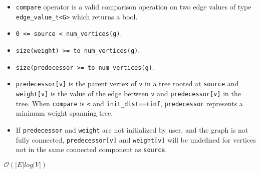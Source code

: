 {\small
      
}

\begin{itemdescr}
      \pnum\mandates
            \begin{itemize}
                  \item
                        \lstinline{compare} operator is a valid comparison operation on two edge values of type \lstinline{edge_value_t<G>} which returns a bool.
            \end{itemize}
      \pnum\hardprecond
            \begin{itemize}
                  \item
                        \lstinline{0 <= source < num_vertices(g)}.
                  \item
                        \lstinline{size(weight) >= to num_vertices(g)}.
                  \item
                        \lstinline{size(predecessor >= to num_vertices(g)}.
            \end{itemize}
      \pnum\effects
            \begin{itemize}
                  \item
                        \lstinline{predecessor[v]} is the parent vertex of \lstinline{v} in a tree rooted at \lstinline{source} and \lstinline{weight[v]} is the value of the edge between \lstinline{v} and \lstinline{predecessor[v]} in the tree. When \lstinline{compare} is \lstinline{<} and \lstinline{init_dist==+inf}, \lstinline{predecessor} represents a minimum weight spanning tree.
                  \item
                        If \lstinline{predecessor} and \lstinline{weight} are not initialized by user, and the graph is not fully connected, \lstinline{predecessor[v]} and \lstinline{weight[v]} will be undefined for vertices not in the same connected component as \lstinline{source}.
            \end{itemize}
      \pnum\complexity $\mathcal{O}(|E|log|V|)$ \\
\end{itemdescr}

